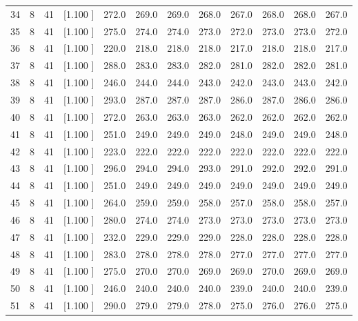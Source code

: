 \documentclass[12pt,a4paper]{article}
\begin{document}
\begin{center}
{\begin{tabular}{r r r r r r r r r r r r}
  34&  8& 41&[1.100     ]&   272.0&   269.0&   269.0&   268.0&   267.0&   268.0&   268.0&   267.0\\[-0.02in]
  35&  8& 41&[1.100     ]&   275.0&   274.0&   274.0&   273.0&   272.0&   273.0&   273.0&   272.0\\[-0.02in]
  36&  8& 41&[1.100     ]&   220.0&   218.0&   218.0&   218.0&   217.0&   218.0&   218.0&   217.0\\[-0.02in]
  37&  8& 41&[1.100     ]&   288.0&   283.0&   283.0&   282.0&   281.0&   282.0&   282.0&   281.0\\[-0.02in]
  38&  8& 41&[1.100     ]&   246.0&   244.0&   244.0&   243.0&   242.0&   243.0&   243.0&   242.0\\[-0.02in]
  39&  8& 41&[1.100     ]&   293.0&   287.0&   287.0&   287.0&   286.0&   287.0&   286.0&   286.0\\[-0.02in]
  40&  8& 41&[1.100     ]&   272.0&   263.0&   263.0&   263.0&   262.0&   262.0&   262.0&   262.0\\[-0.02in]
  41&  8& 41&[1.100     ]&   251.0&   249.0&   249.0&   249.0&   248.0&   249.0&   249.0&   248.0\\[-0.02in]
  42&  8& 41&[1.100     ]&   223.0&   222.0&   222.0&   222.0&   222.0&   222.0&   222.0&   222.0\\[-0.02in]
  43&  8& 41&[1.100     ]&   296.0&   294.0&   294.0&   293.0&   291.0&   292.0&   292.0&   291.0\\[-0.02in]
  44&  8& 41&[1.100     ]&   251.0&   249.0&   249.0&   249.0&   249.0&   249.0&   249.0&   249.0\\[-0.02in]
  45&  8& 41&[1.100     ]&   264.0&   259.0&   259.0&   258.0&   257.0&   258.0&   258.0&   257.0\\[-0.02in]
  46&  8& 41&[1.100     ]&   280.0&   274.0&   274.0&   273.0&   273.0&   273.0&   273.0&   273.0\\[-0.02in]
  47&  8& 41&[1.100     ]&   232.0&   229.0&   229.0&   229.0&   228.0&   228.0&   228.0&   228.0\\[-0.02in]
  48&  8& 41&[1.100     ]&   283.0&   278.0&   278.0&   278.0&   277.0&   277.0&   277.0&   277.0\\[-0.02in]
  49&  8& 41&[1.100     ]&   275.0&   270.0&   270.0&   269.0&   269.0&   270.0&   269.0&   269.0\\[-0.02in]
  50&  8& 41&[1.100     ]&   246.0&   240.0&   240.0&   240.0&   239.0&   240.0&   240.0&   239.0\\[-0.02in]
  51&  8& 41&[1.100     ]&   290.0&   279.0&   279.0&   278.0&   275.0&   276.0&   276.0&   275.0\\[-0.02in]

\end{tabular}}
\end{center}
\end{document}

